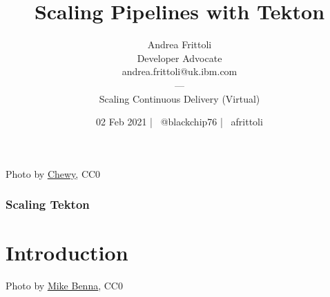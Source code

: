 \documentclass[aspectratio=169,11pt,hyperref={colorlinks=true}]{beamer}
\title{Scaling Pipelines with Tekton}
\date[02 Feb 2021]{02 Feb 2021 | \faTwitter ~@blackchip76 | \faGithub ~afrittoli}
\author[Andrea Frittoli]{
  Andrea Frittoli \\
  Developer Advocate \\
  andrea.frittoli@uk.ibm.com \\
  --- \\
  Scaling Continuous Delivery (Virtual)
}
\begin{document}
\begin{frame}
\titlepage{}
\end{frame}

\begin{lpicrblack}{Photo by \href{https://unsplash.com/@chewy}{\underline{Chewy}}, CC0}
  \frametitle{Scaling Tekton}
\end{lpicrblack}

\section[Introduction]{Introduction}

\begin{sectionwithpic}{Photo by \href{https://unsplash.com/@mbenna}{\underline{Mike Benna}}, CC0}
\end{sectionwithpic}
\end{document}
